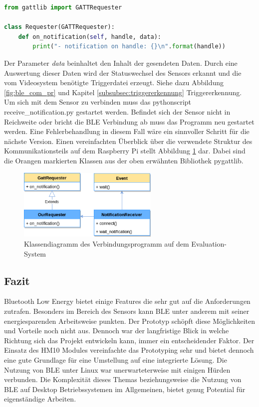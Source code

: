 \begin{lstlisting}[language=Python, caption=pygattlib: Receive notifications example, label=lst:pygattlib_ex]
  from gattlib import GATTRequester

class Requester(GATTRequester):
    def on_notification(self, handle, data):
        print("- notification on handle: {}\n".format(handle))
\end{lstlisting}

Der Parameter \textit{data} beinhaltet den Inhalt der gesendeten Daten. Durch eine Auswertung dieser Daten wird der Statuswechsel des Sensors erkannt und die vom Videosystem benötigte Triggerdatei erzeugt. Siehe dazu Abbildung \ref{fig:ble_com_pr} und Kapitel \ref{subsubsec:triggererkennung} Triggererkennung. \\

Um sich mit dem Sensor zu verbinden muss das pythonscript receive\_notification.py gestartet werden. Befindet sich der Sensor nicht in Reichweite oder bricht die BLE Verbindung ab muss das Programm neu gestartet werden. Eine Fehlerbehandlung in diesem Fall wäre ein sinnvoller Schritt für die nächste Version. Einen vereinfachten Überblick über die verwendete Struktur des Kommunikationsteils auf dem Raspberry Pi stellt Abbildung \ref{fig:classdiagram_connection} dar. Dabei sind die Orangen markierten Klassen aus der oben erwähnten Bibliothek pygattlib.

\begin{figure}[h]
  \centering
  \includegraphics[width=0.6\textwidth]{includes/kom/graphics/gatt_classDiagram2}
  \caption{Klassendiagramm des Verbindungsprogramm auf dem Evaluation-System}
  \label{fig:classdiagram_connection}
\end{figure}


\subsection{Fazit}
Bluetooth Low Energy bietet einige Features die sehr gut auf die Anforderungen zutrafen. Besonders im Bereich des Sensors kann BLE unter anderem mit seiner energiesparenden Arbeitsweise punkten. Der Prototyp schöpft diese Möglichkeiten und Vorteile noch nicht aus. Dennoch war der langfristige Blick in welche Richtung sich das Projekt entwickeln kann, immer ein entscheidender Faktor. Der Einsatz des HM10 Modules vereinfachte das Prototyping sehr und bietet dennoch eine gute Grundlage für eine Umstellung auf eine integrierte Lösung. Die Nutzung von BLE unter Linux war unerwarteterweise mit einigen Hürden verbunden. Die Komplexität dieses Themas beziehungsweise die Nutzung von BLE auf Desktop Betriebssystemen im Allgemeinen, bietet genug Potential für eigenständige Arbeiten.
